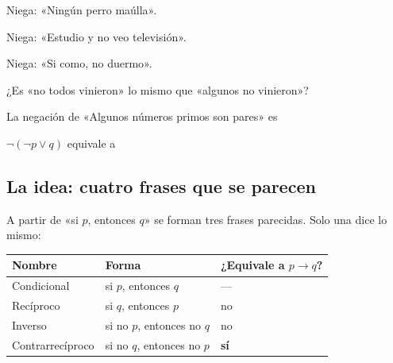 \taller
{}
\begin{ejercicios}
\item Niega: «Ningún perro maúlla». 
\item Niega: «Estudio y no veo televisión». 
\item Niega: «Si como, no duermo». 
\item ¿Es «no todos vinieron» lo mismo que «algunos no vinieron»? 
\end{ejercicios}
\begin{ejercicios}
\item La negación de «Algunos números primos son pares» es
\item $\neg(\neg p \vee q)$ equivale a
\end{ejercicios}

\bitacora


\subsection{La idea: cuatro frases que se parecen}
A partir de «si $p$, entonces $q$» se forman tres frases parecidas. Solo una dice lo mismo:

\begin{center}\small
\begin{tabular}{@{}lll@{}}
\toprule
\textbf{Nombre} & \textbf{Forma} & \textbf{¿Equivale a $p \to q$?}\\\midrule
Condicional & si $p$, entonces $q$ & ---\\
Recíproco & si $q$, entonces $p$ & no\\
Inverso & si no $p$, entonces no $q$ & no\\
Contrarrecíproco & si no $q$, entonces no $p$ & \textbf{sí}\\\bottomrule
\end{tabular}
\end{center}

